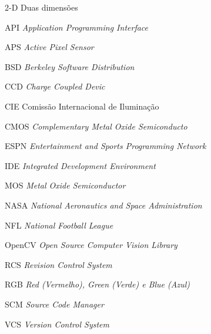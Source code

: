 \begin{siglas}
  \item[2-D] Duas dimensões
  \item[API] \textit{Application Programming Interface}
  \item[APS] \textit{Active Pixel Sensor}
  \item[BSD] \textit{Berkeley Software Distribution}
  \item[CCD] \textit{Charge Coupled Devic}
  \item[CIE] Comissão Internacional de Iluminação
  \item[CMOS] \textit{Complementary Metal Oxide Semiconducto}
  \item[ESPN] \textit{Entertainment and Sports Programming Network}
  \item[IDE] \textit{Integrated Development Environment}
  \item[MOS] \textit{Metal Oxide Semiconductor}
  \item[NASA] \textit{National Aeronautics and Space Administration}
  \item[NFL] \textit{National Football League}
  \item[OpenCV] \textit{Open Source Computer Vision Library}
  \item[RCS] \textit{Revision Control System}
  \item[RGB] \textit{Red (Vermelho), Green (Verde) e Blue (Azul)}
  \item[SCM] \textit{Source Code Manager}
  \item[VCS] \textit{Version Control System}
\end{siglas}